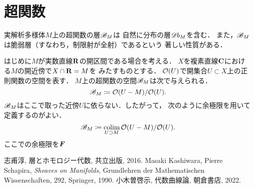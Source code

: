 \section{超関数}

実解析多様体$M$上の超関数の層$\mathscr{B}_M$は
自然に分布の層${\mathscr{D} b}_M$を含む．
また，$\mathscr{B}_M$は脆弱層（すなわち，制限射が全射）であるという
著しい性質がある．

はじめに$M$が実数直線$\mathbf{R}$の開区間である場合を考える．
$X$を複素直線$\mathbf{C}$における$M$の開近傍で$X \cap \mathbf{R} = M$を
みたすものとする．
$\mathcal{O}(U)$で開集合$U\subset X$上の正則関数の空間を表す．
$M$上の超関数の空間$\mathscr{B}_M$は次で与えられる．
\begin{equation}
    \mathscr{B}_M\coloneqq \mathcal{O}(U-M)/\mathcal{O}(U).
\end{equation}
$\mathscr{B}_M$はここで取った近傍$U$に依らない．したがって，
次のように余極限を用いて定義するのがよい．
\begin{equation}
    \mathscr{B}_M\coloneqq\mathop{\mathrm{colim}}_{U\supset M}\mathcal{O}(U-M)/\mathcal{O}(U).
\end{equation}
ここでの余極限を$\mathop{\text{\textit{\textbf{F}}}}$
\begin{thebibliography}{20} 
     志甫淳, 層とホモロジー代数, 共立出版, 2016.
     Masaki Kashiwara, Pierre Schapira, 
        \textit{Sheaves on Manifolds}, 
        Grundlehren der Mathematischen Wissenschaften, 292, Springer, 1990.
     小木曽啓示, 代数曲線論, 朝倉書店, 2022.
\end{thebibliography}





